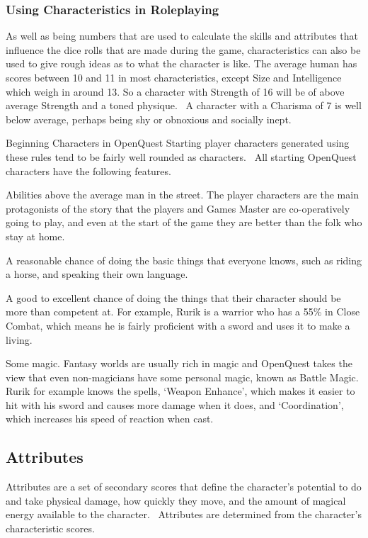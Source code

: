 \subsubsection{Using Characteristics in Roleplaying}
As well as being numbers that are used to calculate the skills and attributes that influence the dice rolls that are made during the game, characteristics can also be used to give rough ideas as to what the character is like. The average human has scores between 10 and 11 in most characteristics, except Size and Intelligence which weigh in around 13. So a character with Strength of 16 will be of above average Strength and a toned physique.  A character with a Charisma of 7 is well below average, perhaps being shy or obnoxious and socially inept. 

\vspace{3mm}
\begin{rpg-titlebox}{Beginning Characters in OpenQuest}
	Starting player characters generated using these rules tend to be fairly well rounded as characters.  All starting OpenQuest characters have the following features. 

	Abilities above the average man in the street. The player characters are the main protagonists of the story that the players and Games Master are co-operatively going to play, and even at the start of the game they are better than the folk who stay at home.

	A reasonable chance of doing the basic things that everyone knows, such as riding a horse, and speaking their own language.

	A good to excellent chance of doing the things that their character should be more than competent at. For example, Rurik is a warrior who has a 55\% in Close Combat, which means he is fairly proficient with a sword and uses it to make a living.

	Some magic. Fantasy worlds are usually rich in magic and OpenQuest takes the view that even non-magicians have some personal magic, known as Battle Magic. Rurik for example knows the spells, ‘Weapon Enhance’, which makes it easier to hit with his sword and causes more damage when it does, and ‘Coordination’, which increases his speed of reaction when cast.
\end{rpg-titlebox}

\subsection{Attributes}
Attributes are a set of secondary scores that define the character’s potential to do and take physical damage, how quickly they move, and the amount of magical energy available to the character.  Attributes are determined from the character’s characteristic scores. 

